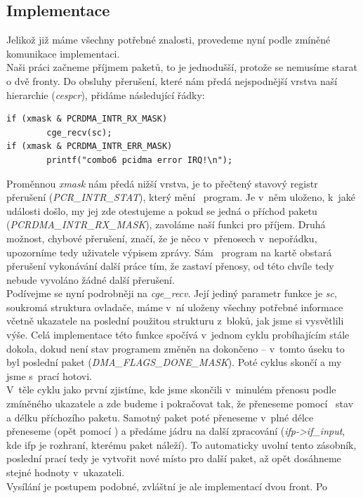   \subsection{Implementace}
  Jelikož již máme všechny potřebné znalosti, provedeme nyní podle zmíněné
  komunikace implementaci. \\ \indent
  Naši práci začneme příjmem paketů, to je jednodušší, protože se nemusíme
  starat
  o dvě fronty. Do obsluhy přerušení, které nám předá nejspodnější vrstva naší
  hierarchie (\emph{cespcr}), přidáme následující řádky:
\begin{verbatim}
if (xmask & PCRDMA_INTR_RX_MASK)
        cge_recv(sc);
if (xmask & PCRDMA_INTR_ERR_MASK)
        printf("combo6 pcidma error IRQ!\n");
\end{verbatim}
  Proměnnou \emph{xmask} nám předá nižší vrstva, je to přečtený stavový
  registr přerušení (\emph{PCR\_INTR\_STAT}), který mění \ppc\ program. Je
  v~něm uloženo, k~jaké události došlo, my jej zde otestujeme a pokud se
  jedná o příchod paketu (\emph{PCRDMA\_INTR\_RX\_MASK}), zavoláme naší funkci
  pro příjem. Druhá možnost, chybové přerušení, značí, že je něco v~přenosech
  v~nepořádku, upozorníme tedy uživatele výpisem zprávy. Sám \ppc\ program
  na kartě
  obstará přerušení vykonávání další práce tím, že zastaví přenosy, od této
  chvíle tedy nebude vyvoláno žádné další přerušení. \\ \indent
  Podívejme se nyní podrobněji na \emph{cge\_recv}. Její jediný parametr
  funkce je \emph{sc}, soukromá struktura ovladače, máme v~ní uloženy všechny
  potřebné informace včetně ukazatele na poslední použitou strukturu z~bloků,
  jak jsme si vysvětlili výše. Celá implementace této funkce spočívá v~jednom
  cyklu probíhajícím stále dokola, dokud není stav programem
  změněn na dokončeno --
  v~tomto úseku to byl poslední paket (\emph{DMA\_FLAGS\_DONE\_MASK}). Poté
  cyklus skončí a my jsme s~prací hotovi. \\ \indent
  V~těle cyklu jako první zjistíme, kde jsme skončili v~minulém přenosu podle
  zmíněného ukazatele a zde budeme i pokračovat tak, že přeneseme pomocí
  \dma\ stav a délku příchozího paketu. Samotný paket poté přeneseme v~plné
  délce přeneseme (opět pomocí \dma) a
  předáme jádru na další zpracování (\emph{ifp->if\_input}, kde ifp je
  rozhraní, kterému paket náleží). To automaticky uvolní tento zásobník,
  poslední prací tedy je vytvořit nové místo pro další paket, až opět
  dosáhneme stejné hodnoty v~ukazateli. \\ \indent
  Vysílání je postupem podobné, zvláštní je ale implementací dvou front. Po
